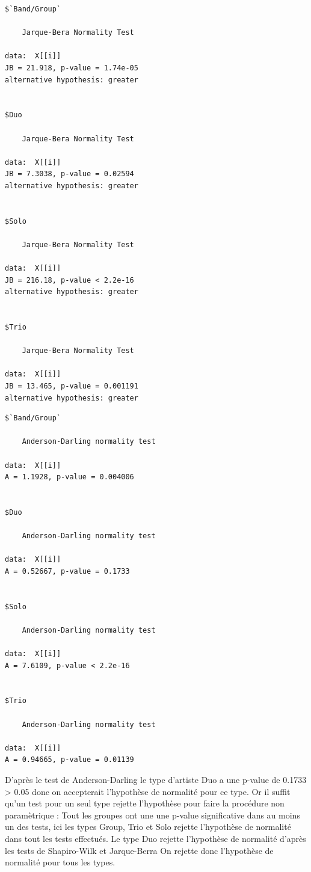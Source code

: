 \documentclass[french,]{compterendu}
\theoremstyle{urcastyle}
\theoremstyle{remark}
\begin{document}
\begin{verbatim}
$`Band/Group`

    Jarque-Bera Normality Test

data:  X[[i]]
JB = 21.918, p-value = 1.74e-05
alternative hypothesis: greater


$Duo

    Jarque-Bera Normality Test

data:  X[[i]]
JB = 7.3038, p-value = 0.02594
alternative hypothesis: greater


$Solo

    Jarque-Bera Normality Test

data:  X[[i]]
JB = 216.18, p-value < 2.2e-16
alternative hypothesis: greater


$Trio

    Jarque-Bera Normality Test

data:  X[[i]]
JB = 13.465, p-value = 0.001191
alternative hypothesis: greater
\end{verbatim}

\begin{verbatim}
$`Band/Group`

    Anderson-Darling normality test

data:  X[[i]]
A = 1.1928, p-value = 0.004006


$Duo

    Anderson-Darling normality test

data:  X[[i]]
A = 0.52667, p-value = 0.1733


$Solo

    Anderson-Darling normality test

data:  X[[i]]
A = 7.6109, p-value < 2.2e-16


$Trio

    Anderson-Darling normality test

data:  X[[i]]
A = 0.94665, p-value = 0.01139
\end{verbatim}

D'après le test de Anderson-Darling le type d'artiste Duo a une p-value de 0.1733 \textgreater{} 0.05 donc on accepterait l'hypothèse de normalité pour ce type. Or il suffit qu'un test pour un seul type rejette l'hypothèse pour faire la procédure non paramètrique :
Tout les groupes ont une une p-value significative dans au moins un des tests, ici les types Group, Trio et Solo rejette l'hypothèse de normalité dans tout les tests effectués. Le type Duo rejette l'hypothèse de normalité d'après les tests de Shapiro-Wilk et Jarque-Berra
On rejette donc l'hypothèse de normalité pour tous les types.
\end{document}
